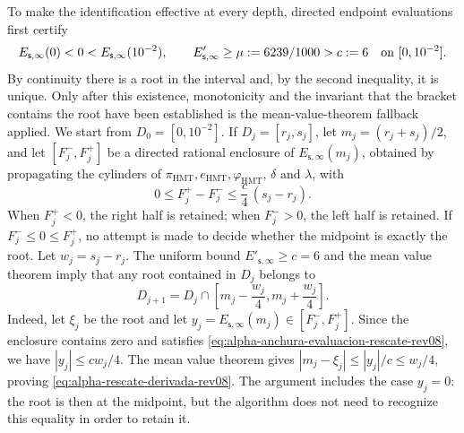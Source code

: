 To make the identification effective at every depth, directed
endpoint evaluations first certify
\[
 E_{\mathsf s,\infty}(0)<0<
 E_{\mathsf s,\infty}(10^{-2}),
 \qquad
 E'_{\mathsf s,\infty}\geq\mu:=6239/1000>c:=6
 \quad\hbox{on }[0,10^{-2}].
\]
By continuity there is a root in the interval and, by the second inequality,
it is unique. Only after this existence, monotonicity and the invariant
that the bracket contains the root have been established is the mean-value-theorem
fallback applied. We start from \(D_0=[0,10^{-2}]\). If
\(D_j=[r_j,s_j]\), let \(m_j=(r_j+s_j)/2\), and let
\([F_j^-,F_j^+]\) be a directed rational enclosure of
\(E_{\mathsf s,\infty}(m_j)\), obtained by propagating the cylinders of
\(\pi_{\mathrm{HMT}},e_{\mathrm{HMT}},\varphi_{\mathrm{HMT}}\),
\(\delta\) and \(\lambda\), with
\begin{equation}
 0\leq F_j^+-F_j^-\leq \frac{c}{4}\,(s_j-r_j).
 \label{eq:alpha-anchura-evaluacion-rescate-rev08}
\end{equation}
When \(F_j^+<0\), the right half is retained;
when \(F_j^->0\), the left half is retained. If
\(F_j^-\leq0\leq F_j^+\), no attempt is made to decide whether the midpoint is
exactly the root. Let \(w_j=s_j-r_j\). The uniform bound
\(E'_{\mathsf s,\infty}\geq c=6\) and the mean value theorem imply that
any root contained in \(D_j\) belongs to
\begin{equation}
 D_{j+1}=D_j\cap
 \left[m_j-\frac{w_j}{4},
             m_j+\frac{w_j}{4}\right].
 \label{eq:alpha-rescate-derivada-rev08}
\end{equation}
Indeed, let \(\xi_j\) be the root and let
\(y_j=E_{\mathsf s,\infty}(m_j)\in[F_j^-,F_j^+]\). Since the enclosure contains
zero and satisfies \eqref{eq:alpha-anchura-evaluacion-rescate-rev08}, we have
\(|y_j|\leq cw_j/4\). The mean value theorem gives
\(|m_j-\xi_j|\leq |y_j|/c\leq w_j/4\), proving
\eqref{eq:alpha-rescate-derivada-rev08}. The argument includes the case
\(y_j=0\): the root is then at the midpoint, but the algorithm does not
need to recognize this equality in order to retain it.

